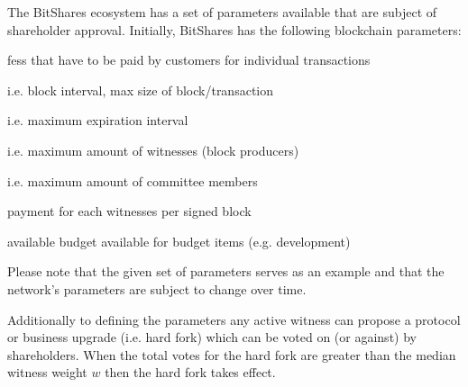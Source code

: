The BitShares ecosystem has a set of parameters available that are subject of
shareholder approval. Initially, BitShares has the following blockchain
parameters:
%
\begin{description}[leftmargin=4em,style=nextline]
 \item[{fee structure}:        ] fess that have to be paid by customers for individual transactions
 \item[{block interval}:       ] i.e. block interval, max size of block/transaction
 \item[{expiration parameters}:] i.e. maximum expiration interval
 \item[{witness parameters}:   ] i.e. maximum amount of witnesses (block producers)
 \item[{committee parameters}: ] i.e. maximum amount of committee members
 \item[{witness pay}:          ] payment for each witnesses per signed block
 \item[{worker budget}:        ] available budget available for budget items (e.g. development)
\end{description}
Please note that the given set of parameters serves as an example and that the
network's parameters are subject to change over time.

\medskip

Additionally to defining the parameters any active witness can propose a
protocol or business upgrade (i.e. hard fork) which can be voted on (or
against) by shareholders. When the total votes for the hard fork are greater
than the median witness weight $w$ then the hard fork takes effect.
